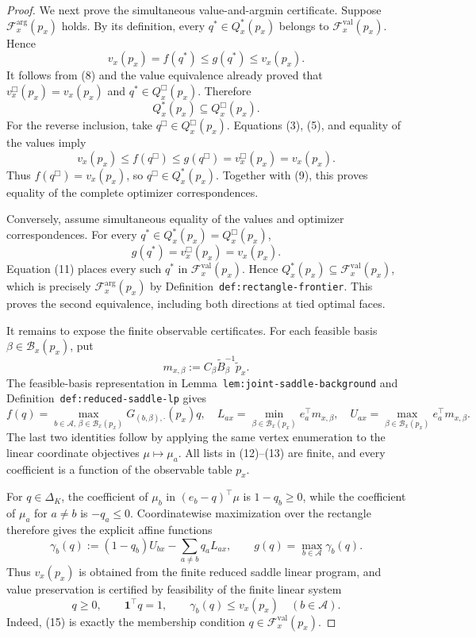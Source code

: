 \documentclass{article}
\begin{document}
\begin{proof}
We next prove the simultaneous value-and-argmin certificate.  Suppose \(\mathcal F_x^{\mathrm{arg}}(p_x)\) holds.  By its definition, every \(q^*\in Q_x^*(p_x)\) belongs to \(\mathcal F_x^{\mathrm{val}}(p_x)\).  Hence
\[
 v_x(p_x)=f(q^*)\leq g(q^*)\leq v_x(p_x).
\tag{8}
\]
It follows from (8) and the value equivalence already proved that \(v_x^{\Box}(p_x)=v_x(p_x)\) and \(q^*\in Q_x^{\Box}(p_x)\).  Therefore
\[
 Q_x^*(p_x)\subseteq Q_x^{\Box}(p_x).
\tag{9}
\]
For the reverse inclusion, take \(q^{\Box}\in Q_x^{\Box}(p_x)\).  Equations (3), (5), and equality of the values imply
\[
 v_x(p_x)\leq f(q^{\Box})\leq g(q^{\Box})
 =v_x^{\Box}(p_x)=v_x(p_x).
\tag{10}
\]
Thus \(f(q^{\Box})=v_x(p_x)\), so \(q^{\Box}\in Q_x^*(p_x)\).  Together with (9), this proves equality of the complete optimizer correspondences.

Conversely, assume simultaneous equality of the values and optimizer correspondences.  For every \(q^*\in Q_x^*(p_x)=Q_x^{\Box}(p_x)\),
\[
 g(q^*)=v_x^{\Box}(p_x)=v_x(p_x).
\tag{11}
\]
Equation (11) places every such \(q^*\) in \(\mathcal F_x^{\mathrm{val}}(p_x)\).  Hence \(Q_x^*(p_x)\subseteq\mathcal F_x^{\mathrm{val}}(p_x)\), which is precisely \(\mathcal F_x^{\mathrm{arg}}(p_x)\) by Definition~\texttt{def:rectangle-frontier}.  This proves the second equivalence, including both directions at tied optimal faces.

It remains to expose the finite observable certificates.  For each feasible basis \(\beta\in\mathcal B_x(p_x)\), put
\[
 m_{x,\beta}:=C_\beta\widetilde B_\beta^{-1}\widetilde p_x.
\tag{12}
\]
The feasible-basis representation in Lemma~\texttt{lem:joint-saddle-background} and Definition~\texttt{def:reduced-saddle-lp} gives
\[
 f(q)=\max_{b\in\mathcal A,\,\beta\in\mathcal B_x(p_x)}
 G_{(b,\beta),\cdot}(p_x)q,
\quad
 L_{ax}=\min_{\beta\in\mathcal B_x(p_x)}e_a^\top m_{x,\beta},
\quad
 U_{ax}=\max_{\beta\in\mathcal B_x(p_x)}e_a^\top m_{x,\beta}.
\tag{13}
\]
The last two identities follow by applying the same vertex enumeration to the linear coordinate objectives \(\mu\mapsto\mu_a\).  All lists in (12)--(13) are finite, and every coefficient is a function of the observable table \(p_x\).

For \(q\in\Delta_K\), the coefficient of \(\mu_b\) in \((e_b-q)^\top\mu\) is \(1-q_b\geq0\), while the coefficient of \(\mu_a\) for \(a\neq b\) is \(-q_a\leq0\).  Coordinatewise maximization over the rectangle therefore gives the explicit affine functions
\[
 \gamma_b(q):=(1-q_b)U_{bx}-\sum_{a\neq b}q_aL_{ax},
 \qquad
 g(q)=\max_{b\in\mathcal A}\gamma_b(q).
\tag{14}
\]
Thus \(v_x(p_x)\) is obtained from the finite reduced saddle linear program, and value preservation is certified by feasibility of the finite linear system
\[
 q\geq0,\qquad \mathbf 1^\top q=1,\qquad
 \gamma_b(q)\leq v_x(p_x)\quad(b\in\mathcal A).
\tag{15}
\]
Indeed, (15) is exactly the membership condition \(q\in\mathcal F_x^{\mathrm{val}}(p_x)\).


\end{proof}
\end{document}
